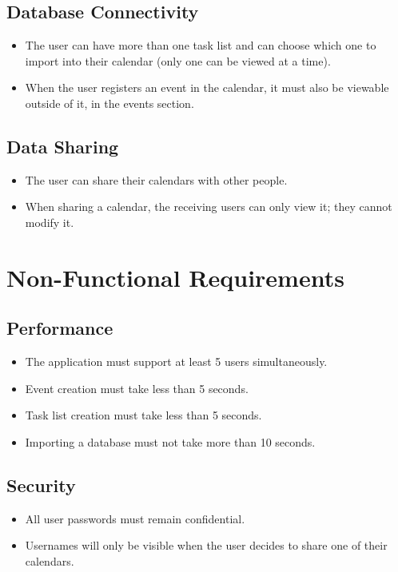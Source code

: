 \documentclass[man]{apa7}
\begin{document}
\subsection{Database Connectivity}
\begin{itemize}
    \item The user can have more than one task list and can choose which one to import into their calendar (only one can be viewed at a time).
    \item When the user registers an event in the calendar, it must also be viewable outside of it, in the events section.
\end{itemize}

\subsection{Data Sharing}
\begin{itemize}
    \item The user can share their calendars with other people.
    \item When sharing a calendar, the receiving users can only view it; they cannot modify it.
\end{itemize}

\section{Non-Functional Requirements}

\subsection{Performance}
\begin{itemize}
    \item The application must support at least 5 users simultaneously.
    \item Event creation must take less than 5 seconds.
    \item Task list creation must take less than 5 seconds.
    \item Importing a database must not take more than 10 seconds.
\end{itemize}

\subsection{Security}
\begin{itemize}
    \item All user passwords must remain confidential.
    \item Usernames will only be visible when the user decides to share one of their calendars.
\end{itemize}
\end{document}
